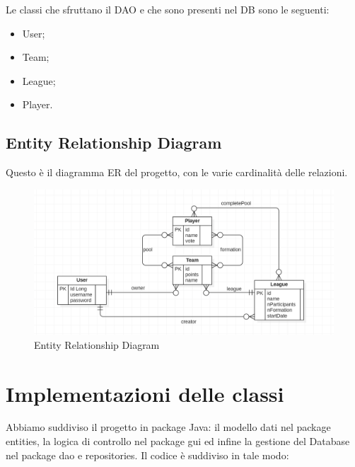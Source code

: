 \documentclass[twoside,openright,titlepage,fleqn,headinclude,12pt,a4paper,BCOR=5mm,footinclude]{scrbook}
\begin{document}
Le classi che sfruttano il DAO e che sono presenti nel DB sono le seguenti:

\begin{itemize}
    \item User;
    \item Team;
    \item League;
    \item Player.
    
\end{itemize}

\section{Entity Relationship Diagram}
Questo è il diagramma ER del progetto, con le varie cardinalità delle relazioni.

\begin{figure}[H]
  \centering
  \includegraphics[width=\linewidth]{images/erDia.png}
  \caption{Entity Relationship Diagram}
  \label{fig:ER Diagram}
\end{figure}

\chapter{Implementazioni delle classi}
Abbiamo suddiviso il progetto in package Java: il modello dati nel package entities, la logica
di controllo nel package gui ed infine la gestione del Database nel package dao e repositories.
Il codice è suddiviso in tale modo:
\end{document}
